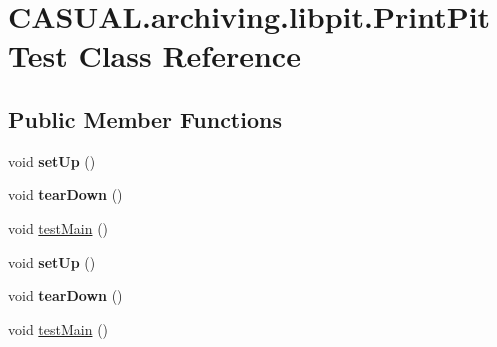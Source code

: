 \hypertarget{class_c_a_s_u_a_l_1_1archiving_1_1libpit_1_1_print_pit_test}{\section{C\-A\-S\-U\-A\-L.\-archiving.\-libpit.\-Print\-Pit\-Test Class Reference}
\label{class_c_a_s_u_a_l_1_1archiving_1_1libpit_1_1_print_pit_test}
}
\subsection*{Public Member Functions}
\begin{DoxyCompactItemize}
\item 
\hypertarget{class_c_a_s_u_a_l_1_1archiving_1_1libpit_1_1_print_pit_test_a005bbb9630e8f2235fb1e5305981763e}{void {\bfseries set\-Up} ()}\label{class_c_a_s_u_a_l_1_1archiving_1_1libpit_1_1_print_pit_test_a005bbb9630e8f2235fb1e5305981763e}

\item 
\hypertarget{class_c_a_s_u_a_l_1_1archiving_1_1libpit_1_1_print_pit_test_abca9206e3105cba2dff9e2166e20b797}{void {\bfseries tear\-Down} ()}\label{class_c_a_s_u_a_l_1_1archiving_1_1libpit_1_1_print_pit_test_abca9206e3105cba2dff9e2166e20b797}

\item 
void \hyperlink{class_c_a_s_u_a_l_1_1archiving_1_1libpit_1_1_print_pit_test_a8cda7943146d8bcd23cef645058a5ab0}{test\-Main} ()
\item 
\hypertarget{class_c_a_s_u_a_l_1_1archiving_1_1libpit_1_1_print_pit_test_a005bbb9630e8f2235fb1e5305981763e}{void {\bfseries set\-Up} ()}\label{class_c_a_s_u_a_l_1_1archiving_1_1libpit_1_1_print_pit_test_a005bbb9630e8f2235fb1e5305981763e}

\item 
\hypertarget{class_c_a_s_u_a_l_1_1archiving_1_1libpit_1_1_print_pit_test_abca9206e3105cba2dff9e2166e20b797}{void {\bfseries tear\-Down} ()}\label{class_c_a_s_u_a_l_1_1archiving_1_1libpit_1_1_print_pit_test_abca9206e3105cba2dff9e2166e20b797}

\item 
void \hyperlink{class_c_a_s_u_a_l_1_1archiving_1_1libpit_1_1_print_pit_test_a8cda7943146d8bcd23cef645058a5ab0}{test\-Main} ()
\end{DoxyCompactItemize}
